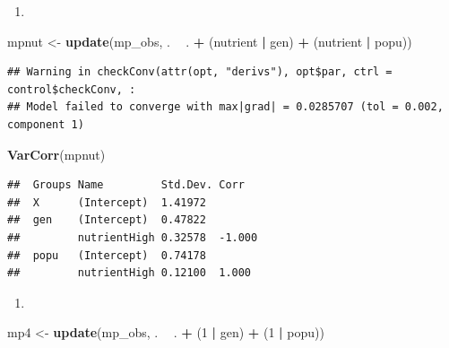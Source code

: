 \documentclass[
  12pt,
]{book}
\newenvironment{Shaded}{\begin{snugshade}}{\end{snugshade}}
\newcommand{\DecValTok}[1]{\textcolor[rgb]{0.00,0.00,0.81}{#1}}
\newcommand{\KeywordTok}[1]{\textcolor[rgb]{0.13,0.29,0.53}{\textbf{#1}}}
\newcommand{\NormalTok}[1]{#1}
\newcommand{\OperatorTok}[1]{\textcolor[rgb]{0.81,0.36,0.00}{\textbf{#1}}}
\newcommand{\StringTok}[1]{\textcolor[rgb]{0.31,0.60,0.02}{#1}}
\begin{document}
\begin{enumerate}
\def\labelenumi{\arabic{enumi}.}
\setcounter{enumi}{1}
\item
\end{enumerate}

\begin{Shaded}
\begin{Highlighting}[]
\NormalTok{mpnut <-}\StringTok{ }\KeywordTok{update}\NormalTok{(mp_obs, . }\OperatorTok{~}\StringTok{ }\NormalTok{. }\OperatorTok{+}\StringTok{ }\NormalTok{(nutrient }\OperatorTok{|}\StringTok{ }\NormalTok{gen) }\OperatorTok{+}\StringTok{ }\NormalTok{(nutrient }\OperatorTok{|}\StringTok{ }\NormalTok{popu))}
\end{Highlighting}
\end{Shaded}

\begin{verbatim}
## Warning in checkConv(attr(opt, "derivs"), opt$par, ctrl = control$checkConv, :
## Model failed to converge with max|grad| = 0.0285707 (tol = 0.002, component 1)
\end{verbatim}

\begin{Shaded}
\begin{Highlighting}[]
\KeywordTok{VarCorr}\NormalTok{(mpnut)}
\end{Highlighting}
\end{Shaded}

\begin{verbatim}
##  Groups Name         Std.Dev. Corr  
##  X      (Intercept)  1.41972        
##  gen    (Intercept)  0.47822        
##         nutrientHigh 0.32578  -1.000
##  popu   (Intercept)  0.74178        
##         nutrientHigh 0.12100  1.000
\end{verbatim}

\begin{enumerate}
\def\labelenumi{\arabic{enumi}.}
\setcounter{enumi}{2}
\item
\end{enumerate}

\begin{Shaded}
\begin{Highlighting}[]
\NormalTok{mp4 <-}\StringTok{ }\KeywordTok{update}\NormalTok{(mp_obs, . }\OperatorTok{~}\StringTok{ }\NormalTok{. }\OperatorTok{+}\StringTok{ }\NormalTok{(}\DecValTok{1} \OperatorTok{|}\StringTok{ }\NormalTok{gen) }\OperatorTok{+}\StringTok{ }\NormalTok{(}\DecValTok{1} \OperatorTok{|}\StringTok{ }\NormalTok{popu))}
\end{Highlighting}
\end{Shaded}
\end{document}
